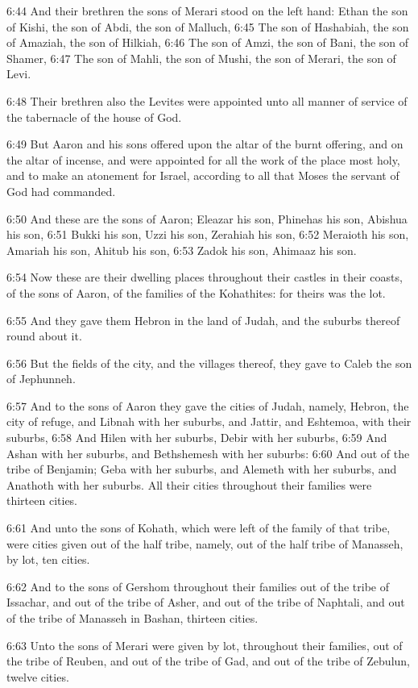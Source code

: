 6:44 And their brethren the sons of Merari stood on the left hand: Ethan the son of Kishi, the son of Abdi, the son of Malluch, 6:45 The son of Hashabiah, the son of Amaziah, the son of Hilkiah, 6:46 The son of Amzi, the son of Bani, the son of Shamer, 6:47 The son of Mahli, the son of Mushi, the son of Merari, the son of Levi.

6:48 Their brethren also the Levites were appointed unto all manner of service of the tabernacle of the house of God.

6:49 But Aaron and his sons offered upon the altar of the burnt offering, and on the altar of incense, and were appointed for all the work of the place most holy, and to make an atonement for Israel, according to all that Moses the servant of God had commanded.

6:50 And these are the sons of Aaron; Eleazar his son, Phinehas his son, Abishua his son, 6:51 Bukki his son, Uzzi his son, Zerahiah his son, 6:52 Meraioth his son, Amariah his son, Ahitub his son, 6:53 Zadok his son, Ahimaaz his son.

6:54 Now these are their dwelling places throughout their castles in their coasts, of the sons of Aaron, of the families of the Kohathites: for theirs was the lot.

6:55 And they gave them Hebron in the land of Judah, and the suburbs thereof round about it.

6:56 But the fields of the city, and the villages thereof, they gave to Caleb the son of Jephunneh.

6:57 And to the sons of Aaron they gave the cities of Judah, namely, Hebron, the city of refuge, and Libnah with her suburbs, and Jattir, and Eshtemoa, with their suburbs, 6:58 And Hilen with her suburbs, Debir with her suburbs, 6:59 And Ashan with her suburbs, and Bethshemesh with her suburbs: 6:60 And out of the tribe of Benjamin; Geba with her suburbs, and Alemeth with her suburbs, and Anathoth with her suburbs. All their cities throughout their families were thirteen cities.

6:61 And unto the sons of Kohath, which were left of the family of that tribe, were cities given out of the half tribe, namely, out of the half tribe of Manasseh, by lot, ten cities.

6:62 And to the sons of Gershom throughout their families out of the tribe of Issachar, and out of the tribe of Asher, and out of the tribe of Naphtali, and out of the tribe of Manasseh in Bashan, thirteen cities.

6:63 Unto the sons of Merari were given by lot, throughout their families, out of the tribe of Reuben, and out of the tribe of Gad, and out of the tribe of Zebulun, twelve cities.

